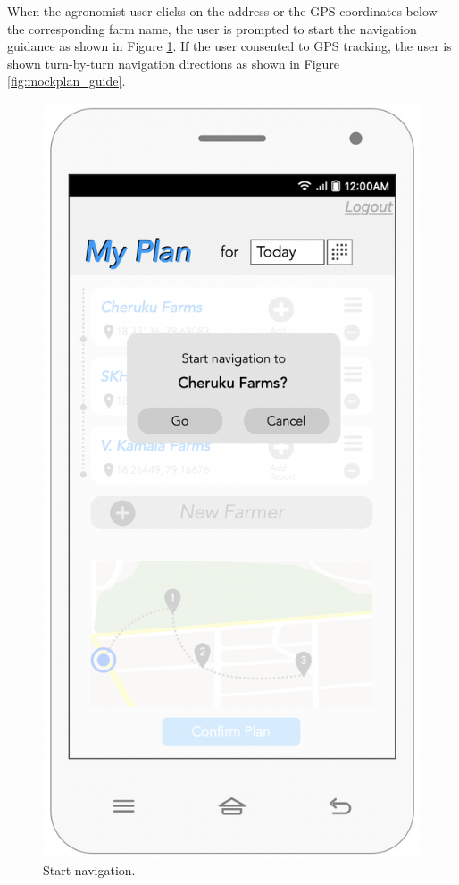 \newpage
\noindent
When the agronomist user clicks on the address or the GPS coordinates below the corresponding farm name, the user is prompted to start the navigation guidance as shown in Figure \ref{fig:mockplan_nav}. If the user consented to GPS tracking, the user is shown turn-by-turn navigation directions as shown in Figure \ref{fig:mockplan_guide}.

\begin{multicols}{2}
\begin{figure}[H]
\centering
\includegraphics[scale=0.5]{../images_diagrams/mock_ups/dd/Plan03_StartNav.png}
\caption{\label{fig:mockplan_nav}Start navigation.}
\end{figure}


\end{multicols}
